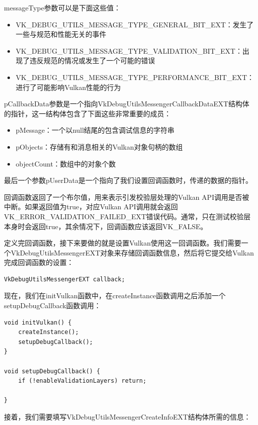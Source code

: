 \documentclass{ctexart}
\begin{document}
messageType参数可以是下面这些值：

\begin{itemize}
	\item VK\_DEBUG\_UTILS\_MESSAGE\_TYPE\_GENERAL\_BIT\_EXT：发生了一些与规范和性能无关的事件
	\item VK\_DEBUG\_UTILS\_MESSAGE\_TYPE\_VALIDATION\_BIT\_EXT：出现了违反规范的情况或发生了一个可能的错误
	\item VK\_DEBUG\_UTILS\_MESSAGE\_TYPE\_PERFORMANCE\_BIT\_EXT：进行了可能影响Vulkan性能的行为
\end{itemize}

pCallbackData参数是一个指向VkDebugUtilsMessengerCallbackDataEXT结构体的指针，这一结构体包含了下面这些非常重要的成员：

\begin{itemize}
	\item pMessage：一个以null结尾的包含调试信息的字符串
	\item pObjects：存储有和消息相关的Vulkan对象句柄的数组
	\item objectCount：数组中的对象个数
\end{itemize}

最后一个参数pUserData是一个指向了我们设置回调函数时，传递的数据的指针。

回调函数返回了一个布尔值，用来表示引发校验层处理的Vulkan API调用是否被中断。如果返回值为true，对应Vulkan API调用就会返回VK\_ERROR\_VALIDATION\_FAILED\_EXT错误代码。通常，只在测试校验层本身时会返回true，其余情况下，回调函数应该返回VK\_FALSE。

定义完回调函数，接下来要做的就是设置Vulkan使用这一回调函数。我们需要一个VkDebugUtilsMessengerEXT对象来存储回调函数信息，然后将它提交给Vulkan完成回调函数的设置：

\begin{lstlisting}[language={[ANSI]C}]
VkDebugUtilsMessengerEXT callback;
\end{lstlisting}

现在，我们在initVulkan函数中，在createInstance函数调用之后添加一个setupDebugCallback函数调用：

\begin{lstlisting}[language={[ANSI]C}]
void initVulkan() {
	createInstance();
	setupDebugCallback();
}

void setupDebugCallback() {
	if (!enableValidationLayers) return;

}
\end{lstlisting}

接着，我们需要填写VkDebugUtilsMessengerCreateInfoEXT结构体所需的信息：
\end{document}
